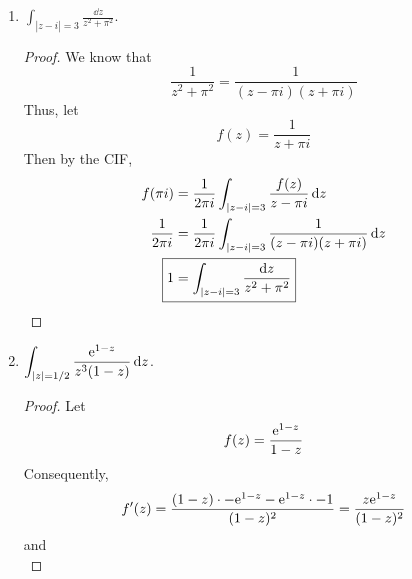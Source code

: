 \documentclass[../psets.tex]{subfiles}
\begin{document}
\begin{enumerate}[ref={A.\arabic*}]
\begin{enumerate}
\begin{proof}
            Let
            \begin{equation*}
                f(z) = \frac{1}{(z-1)^3}
            \end{equation*}
            Then by the CIF,
            \begin{align*}
                f(-1) &= \frac{1}{2\pi i}\int_{|\zeta+1|=1}\frac{f(\zeta)}{\zeta+1}\dd\zeta\\
                -\frac{1}{8} &= \frac{1}{2\pi i}\int_{|z+1|=1}\frac{f(z)}{z+1}\dd{z}\\
                \Aboxed{-\frac{\pi i}{4} &= \int_{|z+1|=1}\frac{\dd{z}}{(z+1)(z-1)^3}}
            \end{align*}
        \end{proof}
        \item $\displaystyle\int_{|z-i|=3}\frac{\dd{z}}{z^2+\pi^2}$.
        \begin{proof}
            We know that
            \begin{equation*}
                \frac{1}{z^2+\pi^2} = \frac{1}{(z-\pi i)(z+\pi i)}
            \end{equation*}
            Thus, let
            \begin{equation*}
                f(z) = \frac{1}{z+\pi i}
            \end{equation*}
            Then by the CIF,
            \begin{align*}
                f(\pi i) &= \frac{1}{2\pi i}\int_{|z-i|=3}\frac{f(z)}{z-\pi i}\dd{z}\\
                \frac{1}{2\pi i} &= \frac{1}{2\pi i}\int_{|z-i|=3}\frac{1}{(z-\pi i)(z+\pi i)}\dd{z}\\
                \Aboxed{1 &= \int_{|z-i|=3}\frac{\dd{z}}{z^2+\pi^2}}
            \end{align*}
        \end{proof}
        \item $\displaystyle\int_{|z|=1/2}\frac{\e[1-z]}{z^3(1-z)}\dd{z}$.
        \begin{proof}
            Let
            \begin{equation*}
                f(z) = \frac{\e[1-z]}{1-z}
            \end{equation*}
            Consequently,
            \begin{equation*}
                f'(z) = \frac{(1-z)\cdot -\e[1-z]-\e[1-z]\cdot -1}{(1-z)^2}
                = \frac{z\e[1-z]}{(1-z)^2}
            \end{equation*}
            and
            \begin{equation*}

\end{equation*}
\end{proof}
\end{enumerate}
\end{enumerate}
\end{document}
